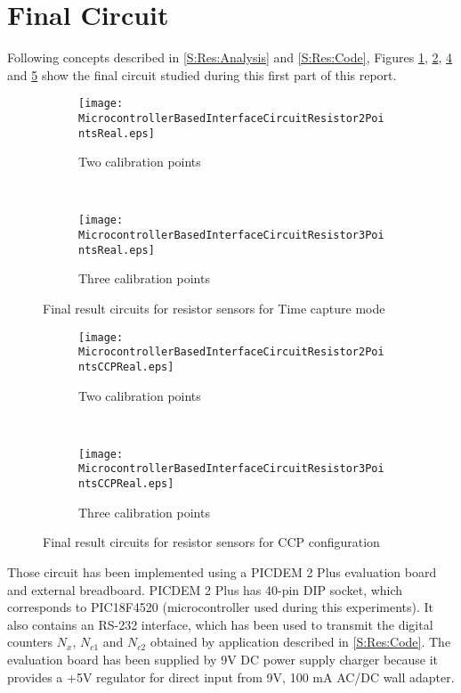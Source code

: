 \section{Final Circuit}\label{S:Res:Circuit}
Following concepts described in \ref{S:Res:Analysis} and \ref{S:Res:Code}, Figures \ref{fig:uR2PointsReal}, \ref{fig:uR3PointsReal}, \ref{fig:uR2PointsCCPReal} and \ref{fig:uR3PointsCCPReal} show the final circuit studied during this first part of this report.
\medskip

\begin{figure}[!ht]
\centering
	\begin{subfigure}{0.75\textwidth}
	\texttt{[image: MicrocontrollerBasedInterfaceCircuitResistor2PointsReal.eps]}
	\caption{Two calibration points}
	\label{fig:uR2PointsReal}
	\end{subfigure}
	~
	\begin{subfigure}{0.75\textwidth}
	\centering
	\texttt{[image: MicrocontrollerBasedInterfaceCircuitResistor3PointsReal.eps]}
	\caption{Three calibration points}
	\label{fig:uR3PointsReal}
	\end{subfigure}
\caption{Final result circuits for resistor sensors for Time capture mode}
\label{fig:FinalCircuits}
\end{figure}

\begin{figure}[!ht]
\centering
	\begin{subfigure}{0.75\textwidth}
	\centering
	\texttt{[image: MicrocontrollerBasedInterfaceCircuitResistor2PointsCCPReal.eps]}
	\caption{Two calibration points}
	\label{fig:uR2PointsCCPReal}
	\end{subfigure}
	~
	\begin{subfigure}{0.75\textwidth}
	\centering
	\texttt{[image: MicrocontrollerBasedInterfaceCircuitResistor3PointsCCPReal.eps]}
	\caption{Three calibration points}
	\label{fig:uR3PointsCCPReal}
	\end{subfigure}
\caption{Final result circuits for resistor sensors for CCP configuration}
\label{fig:FinalCircuitsCCP}
\end{figure}

Those circuit has been implemented using a PICDEM 2 Plus evaluation board and external breadboard. PICDEM 2 Plus has 40-pin DIP socket, which corresponds to PIC18F4520 (microcontroller used during this experiments). It also contains an RS-232 interface, which has been used to transmit the digital counters $N_{x}$, $N_{c1}$ and $N_{c2}$ obtained by application described in \ref{S:Res:Code}. The evaluation board has been supplied by 9V DC power supply charger because it provides a +5V regulator for direct input from 9V, 100 mA AC/DC wall adapter.
\medskip

